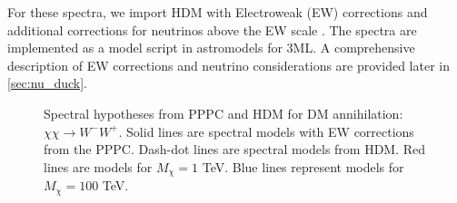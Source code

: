 For these spectra, we import HDM with Electroweak (EW) corrections and additional corrections for neutrinos above the EW scale \cite{HDMSpectra}.
The spectra are implemented as a model script in astromodels for 3ML.
A comprehensive description of EW corrections and neutrino considerations are provided later in \cref{sec:nu_duck}.

\begin{figure}[t]
    \caption{Spectral hypotheses from PPPC \cite{Cirelli_2011} and HDM \cite{HDMSpectra} for DM annihilation: $\chi\chi \rightarrow W^-W^+$. Solid lines are spectral models with EW corrections from the PPPC. Dash-dot lines are spectral models from HDM. Red lines are models for $M_\chi = 1$ TeV. Blue lines represent models for $M_\chi = 100$ TeV.}
    \label{fig:pppc_vs_hdm}
\end{figure}

